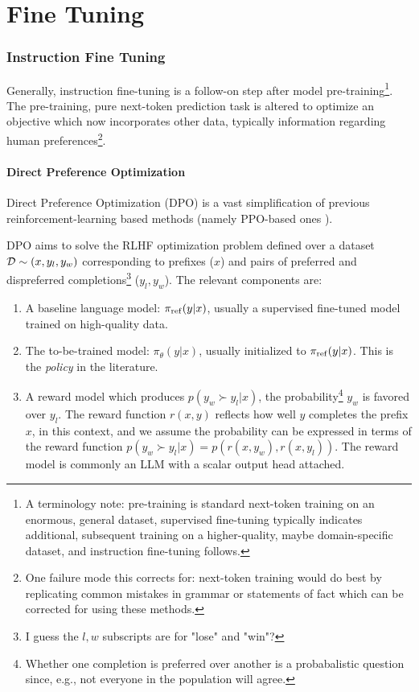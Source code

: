 \part{Fine Tuning}

\section{Instruction Fine Tuning}

Generally, instruction fine-tuning is a follow-on step after model pre-training\footnote{A
terminology note: pre-training is standard next-token training on an enormous, general dataset, supervised
fine-tuning typically indicates additional, subsequent training on a higher-quality, maybe
domain-specific dataset, and instruction fine-tuning follows.}.
The pre-training, pure next-token prediction task is altered to optimize an objective which now
incorporates other data, typically information regarding human preferences\footnote{One failure mode
this corrects for: next-token training would do best by replicating common mistakes in grammar or
statements of fact which can be corrected for using these methods.}.


\subsection{Direct Preference Optimization \label{subsec_dpo}}

Direct Preference Optimization (DPO) \cite{rafailov2024directpreferenceoptimizationlanguage} is a
vast simplification of previous reinforcement-learning based methods (namely PPO-based ones
\cite{schulman2017proximalpolicyoptimizationalgorithms}).


DPO aims to solve the RLHF optimization problem defined over a dataset $\mathcal{D} \sim  (x, y _{ l }, y
_{ w }) $ corresponding to prefixes ($ x $) and pairs of preferred and dispreferred
completions\footnote{I guess the $ l, w $ subscripts are for "lose" and "win"?} ($ y _{ l }, y _{ w
} $). The relevant components are:
\begin{enumerate}
    \item A baseline language model: $ \pi _{ {\rm  ref} } (y|x)$, usually a supervised fine-tuned
        model trained on high-quality data.
    \item The to-be-trained model: $ \pi _{\theta } (y|x)$, usually initialized to $ \pi _{ {\rm
        ref} } (y|x)$. This is the \textit{policy} in the literature.
    \item A reward model which produces $ p(y _{ w } \succ y _{ l }| x ) $, the
        probability\footnote{Whether one completion is preferred over another is a probabalistic
        question since, e.g., not everyone in the population will agree.} $ y _{ w } $ is favored
        over $ y _{ l } $.  The reward function $ r(x, y) $ reflects how well $ y $ completes the
        prefix $ x $, in this context, and we assume the probability can be expressed in terms of
        the reward function $ p(y _{ w } \succ y _{ l }| x ) = p( r(x, y _{ w }), r(x, y _{ l }) )
        $. The reward model is commonly an LLM with a scalar output head attached.
\end{enumerate}


